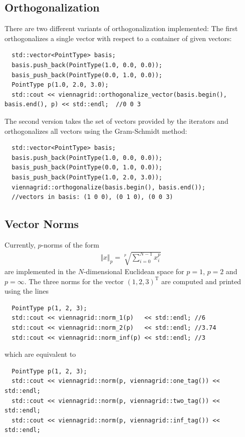    \subsection{Orthogonalization}
 There are two different variants of orthogonalization implemented: The first orthogonalizes a single vector with respect to a container of given vectors:
 \begin{lstlisting}
  std::vector<PointType> basis;
  basis.push_back(PointType(1.0, 0.0, 0.0));
  basis_push_back(PointType(0.0, 1.0, 0.0));
  PointType p(1.0, 2.0, 3.0);
  std::cout << viennagrid::orthogonalize_vector(basis.begin(), basis.end(), p) << std::endl;  //0 0 3
 \end{lstlisting}
 The second version takes the set of vectors provided by the iterators and orthogonalizes all vectors using the Gram-Schmidt method:
 \begin{lstlisting}
  std::vector<PointType> basis;
  basis.push_back(PointType(1.0, 0.0, 0.0));
  basis_push_back(PointType(0.0, 1.0, 0.0));
  basis_push_back(PointType(1.0, 2.0, 3.0));
  viennagrid::orthogonalize(basis.begin(), basis.end());
  //vectors in basis: (1 0 0), (0 1 0), (0 0 3)
 \end{lstlisting}

  \subsection{Vector Norms}
 Currently, $p$-norms of the form
  \begin{align}
   \Vert x \Vert_p = \sqrt[p]{\sum_{i=0}^{N-1} x_i^p}
  \end{align}
 are implemented in the $N$-dimensional Euclidean space for $p=1$, $p=2$ and $p=\infty$. The three norms for the vector $(1,2,3)^\mathrm{T}$ are computed and printed using the lines
 \begin{lstlisting}
  PointType p(1, 2, 3);
  std::cout << viennagrid::norm_1(p)   << std::endl; //6
  std::cout << viennagrid::norm_2(p)   << std::endl; //3.74
  std::cout << viennagrid::norm_inf(p) << std::endl; //3
 \end{lstlisting}
which are equivalent to
 \begin{lstlisting}
  PointType p(1, 2, 3);
  std::cout << viennagrid::norm(p, viennagrid::one_tag()) << std::endl;
  std::cout << viennagrid::norm(p, viennagrid::two_tag()) << std::endl;
  std::cout << viennagrid::norm(p, viennagrid::inf_tag()) << std::endl;
 \end{lstlisting}


